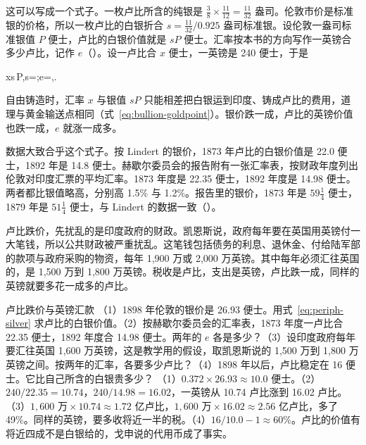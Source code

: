 这可以写成一个式子。一枚卢比所含的纯银是 $\tfrac38\times\tfrac{11}{12}=\tfrac{11}{32}$ 盎司。伦敦市价是标准银的价格，所以一枚卢比的白银折合 $s=\tfrac{11}{32}/0.925$ 盎司标准银。设伦敦一盎司标准银值 $P$ 便士，卢比的白银价值就是 $sP$ 便士。汇率按本书的方向写作一英镑合多少卢比，记作 $e$（）。设一卢比合 $x$ 便士，一英镑是 240 便士，于是
\begin{keyeq}
x\approx s\,P,\qquad s=;\qquad e=,\qquad {}\approx{}.\label{eq:periph-silver}
\end{keyeq}
自由铸造时，汇率 $x$ 与银值 $sP$ 只能相差把白银运到印度、铸成卢比的费用，道理与黄金输送点相同（式~\eqref{eq:bullion-goldpoint}）。银价跌一成，卢比的英镑价值也跌一成，$e$ 就涨一成多。

数据大致合乎这个式子。按 Lindert 的银价，1873 年卢比的白银价值是 22.0 便士，1892 年是 14.8 便士\cite{lindert2006}。赫歇尔委员会的报告附有一张汇率表，按财政年度列出伦敦对印度汇票的平均汇率\cite{herschell1893}。1873 年度是 22.35 便士，1892 年度是 14.98 便士\cite{herschell1893}。两者都比银值略高，分别高 1.5\% 与 1.2\%。报告里的银价，1873 年是 $59\tfrac14$ 便士，1879 年是 $51\tfrac14$ 便士，与 Lindert 的数据一致\cite{herschell1893,lindert2006}（）。


卢比跌价，先扰乱的是印度政府的财政。凯恩斯说，政府每年要在英国用英镑付一大笔钱，所以公共财政被严重扰乱\cite{keynes1913}。这笔钱包括债务的利息、退休金、付给陆军部的款项与政府采购的物资，每年 1,900 万或 2,000 万英镑\cite{keynes1913}。其中每年必须汇往英国的，是 1,500 万到 1,800 万英镑\cite{keynes1913}。税收是卢比，支出是英镑，卢比跌一成，同样的英镑就要多花一成多的卢比。

\begin{example}{卢比跌价与英镑汇款}\label{ex:periph-rupee}
（1）1898 年伦敦的银价是 26.93 便士。用式~\eqref{eq:periph-silver} 求卢比的白银价值。（2）按赫歇尔委员会的汇率表，1873 年度一卢比合 22.35 便士，1892 年度合 14.98 便士。两年的 $e$ 各是多少？（3）设印度政府每年要汇往英国 1,600 万英镑，这是教学用的假设，取凯恩斯说的 1,500 万到 1,800 万英镑之间。按两年的汇率，各要多少卢比？（4）1898 年以后，卢比稳定在 16 便士。它比自己所含的白银贵多少？
\solution （1）$0.372\times26.93\approx10.0$ 便士。（2）$240/22.35=10.74$，$240/14.98=16.02$，一英镑从 10.74 卢比涨到 16.02 卢比。（3）$1{,}600\text{ 万}\times10.74\approx1.72$ 亿卢比，$1{,}600\text{ 万}\times16.02\approx2.56$ 亿卢比，多了 49\%。同样的英镑，要多收将近一半的税。（4）$16/10.0-1\approx60\%$。卢比的价值有将近四成不是白银给的，戈申说的代用币成了事实。
\end{example}

